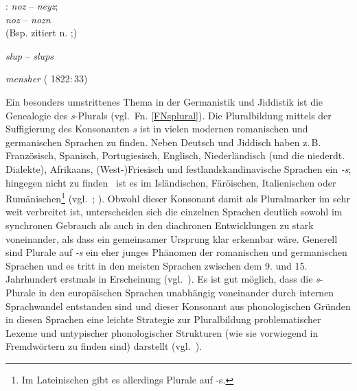 { \hai{{\ZOJ}}: {\Sg}  \textit{noz}  –  {\Pl}  \textit{neyz};\\
  {\Sg}  \textit{noz}  –  {\Pl}  \textit{nozn} \\
 (Bsp. zitiert n. \citealt{Weinreich1960b};\citeyear[9–11]{Weinreich1962})\label{PLji1dialekt} 
    \item {\Sg}  \textit{slup}  – {\Pl}  \textit{slups}  \label{PLji1sslav} 
    \item {\Pl}  \textit{mensher}  ( 1822:\,33) \label{PLWJgrob}    
 }
 
 
 
 Ein besonders umstrittenes Thema in der Germanistik und Jiddistik ist die Genealogie des \textit{s}-Plurals (vgl.\, Fn. \ref{FNsplural}).\label{sPlural} Die Pluralbildung mittels der Suffigierung des Konsonanten \textit{s} ist in vielen modernen romanischen und germanischen Sprachen zu finden. Neben Deutsch und Jiddisch haben z.\,B.\, Französisch, Spanisch, Portugiesisch, Englisch, Niederländisch (und die niederdt. Dialekte), Afrikaans, (West-)Friesisch und  festlandskandinavische Sprachen ein  \textit{-s}; hingegen nicht zu finden \,%
 ist es im Isländischen, Färöischen, Italienischen oder Rumänischen\footnote{Im Lateinischen gibt es allerdings Plurale auf -s.} (vgl.\, \citealt{NueblingSchmuck2010}; \citealt[88]{Hoekstra2001}). Obwohl dieser Konsonant damit als Pluralmarker im  sehr weit verbreitet ist, unterscheiden sich die einzelnen Sprachen 
deutlich sowohl im synchronen Gebrauch als auch in den diachronen Entwicklungen zu stark voneinander, als dass ein gemeinsamer Ursprung klar erkennbar wäre. Generell sind Plurale auf \textit{-s} ein eher junges Phänomen der romanischen und germanischen Sprachen und es tritt in den meisten Sprachen zwischen dem 9. und 15. Jahrhundert erstmals in Erscheinung (vgl.\, \citealt{NueblingSchmuck2010}). Es ist gut möglich, dass die \textit{s}-Plurale in den europäischen Sprachen unabhängig voneinander durch internen Sprachwandel entstanden sind und dieser Konsonant aus phonologischen Gründen in diesen Sprachen eine leichte Strategie zur Pluralbildung problematischer Lexeme und untypischer phonologischer Strukturen (wie sie vorwiegend in Fremdwörtern zu finden sind) darstellt (vgl.\, \citealt{Wiese2009}).
 

